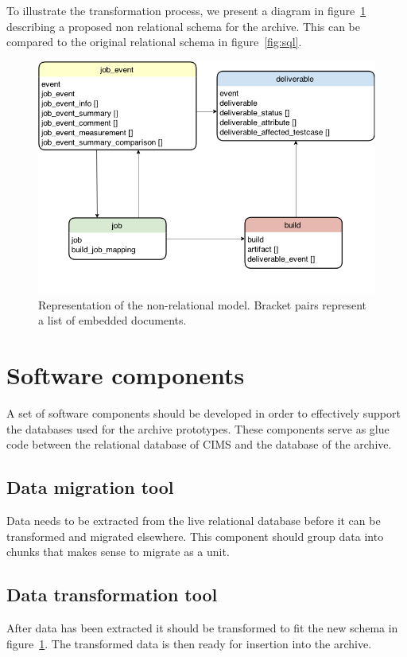 To illustrate the transformation process, we present a diagram in figure~\ref{fig:nosql} describing a proposed non relational schema for the archive. This can be compared to the original relational schema in figure~\ref{fig:sql}.

\begin{figure}[h!]
\centering
\includegraphics[scale=0.5]{figure/nosql.png}
\caption{Representation of the non-relational model. Bracket pairs represent a list of embedded documents.}
\label{fig:nosql}
\end{figure}

\section{Software components}
A set of software components should be developed in order to effectively support the databases used for the archive prototypes. These components serve as glue code between the relational database of CIMS and the database of the archive. 

\subsection{Data migration tool}
Data needs to be extracted from the live relational database before it can be transformed and migrated elsewhere. This component should group data into chunks that makes sense to migrate as a unit.

\subsection{Data transformation tool}
After data has been extracted it should be transformed to fit the new schema in figure~\ref{fig:nosql}. The transformed data is then ready for insertion into the archive.

